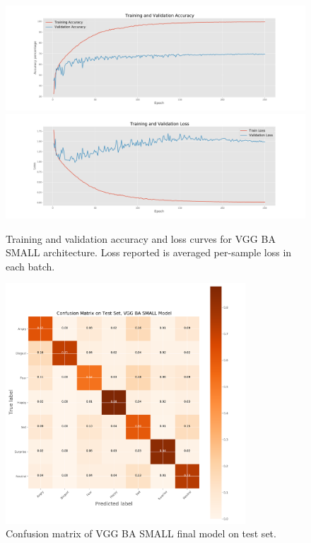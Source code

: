 \documentclass{article}
\begin{document}
\begin{figure}[]
    \centering
    \includegraphics[width=\textwidth]{figs/acc.pdf}
    \includegraphics[width=\textwidth]{figs/loss.pdf}
    \caption{Training and validation accuracy and loss curves for VGG BA SMALL architecture. Loss reported is averaged per-sample loss in each batch.}
    \label{fig:vgg ba small curves}
\end{figure}
\begin{figure}[]
    \centering
    \includegraphics[width=0.8\textwidth]{figs/confusion.pdf}
    \caption{Confusion matrix of VGG BA SMALL final model on test set. }
    \label{fig:vgg ba small confusion}
\end{figure}
\end{document}

